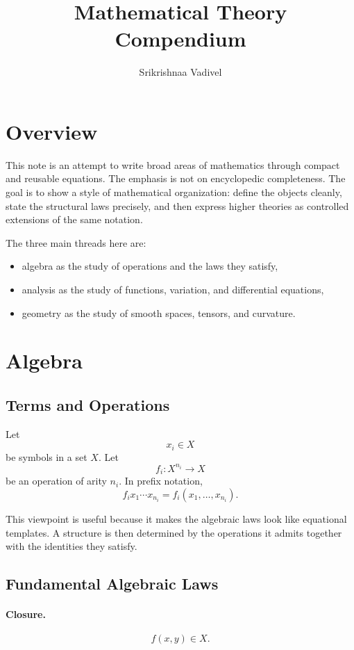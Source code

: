 \documentclass[11pt]{article}
\title{Mathematical Theory Compendium}
\author{Srikrishnaa Vadivel}
\date{}
\begin{document}
\maketitle
\tableofcontents

\section{Overview}

This note is an attempt to write broad areas of mathematics through compact and
reusable equations. The emphasis is not on encyclopedic completeness. The goal
is to show a style of mathematical organization: define the objects cleanly,
state the structural laws precisely, and then express higher theories as
controlled extensions of the same notation.

The three main threads here are:
\begin{itemize}
  \item algebra as the study of operations and the laws they satisfy,
  \item analysis as the study of functions, variation, and differential
  equations,
  \item geometry as the study of smooth spaces, tensors, and curvature.
\end{itemize}

\section{Algebra}

\subsection{Terms and Operations}

Let
\[
  x_i \in X
\]
be symbols in a set \(X\). Let
\[
  f_i : X^{n_i} \to X
\]
be an operation of arity \(n_i\). In prefix notation,
\[
  f_i x_1 \cdots x_{n_i} = f_i(x_1,\dots,x_{n_i}).
\]

This viewpoint is useful because it makes the algebraic laws look like
equational templates. A structure is then determined by the operations it
admits together with the identities they satisfy.

\subsection{Fundamental Algebraic Laws}

\paragraph{Closure.}
\[
  f(x,y) \in X.
\]
\end{document}
